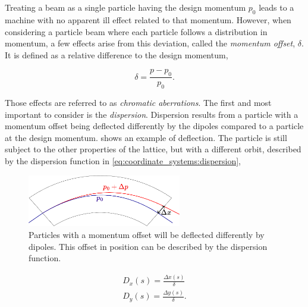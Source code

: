 \section{}

\subsection{}

Treating a beam as a single particle having the design momentum $p_0$ leads to a machine with no
apparent ill effect related to that momentum.
However, when considering a particle beam where each particle follows a distribution in
momentum, a few effects arise from this deviation, called the \textit{momentum offset},
$\delta$. It is defined as a relative difference to the design momentum,

\begin{equation}
    \delta = \frac{p - p_0}{p_0}.
    \label{eq:coordinate_systems:momentum_offset}
\end{equation}

Those effects are referred to as \textit{chromatic aberrations}. The first and most important to
consider is the \textit{dispersion}. Dispersion results from a particle with a momentum offset
being deflected differently by the dipoles compared to a particle at the design momentum.
 shows an example of deflection. 
The particle is still subject to the other properties of the lattice, but with a different orbit,
described by the dispersion function in \cref{eq:coordinate_systems:dispersion},

\begin{figure}[!htb]
    \centering
    \includegraphics[width=0.6\textwidth]{images/dipole.pdf}
    \caption{Particles with a momentum offset will be deflected differently by dipoles. This offset
            in position can be described by the dispersion function.}
    \label{fig:coordinate_systems:dispersion}
\end{figure}

\begin{equation}
    \begin{aligned}
    D_x(s) = \frac{\Delta x(s)}{\delta} \\
    D_y(s) = \frac{\Delta y(s)}{\delta}.
    \end{aligned}
    \label{eq:coordinate_systems:dispersion}
\end{equation}

